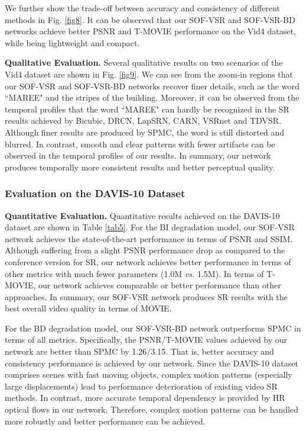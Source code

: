 \documentclass[journal]{IEEEtran}
\begin{document}
\begin{table*}[htp]
	We further show the trade-off between accuracy and consistency of different methods in Fig. \ref{fig8}. It can be observed that our SOF-VSR and SOF-VSR-BD networks achieve better PSNR and T-MOVIE performance on the Vid4 dataset, while being lightweight and compact.
	
	\textbf{Qualitative Evaluation.}
	Several qualitative results on two scenarios of the Vid4 dataset are shown in Fig. \ref{fig9}. We can see from the zoom-in regions that our SOF-VSR and SOF-VSR-BD networks recover finer details, such as the word ``MAREE" and the stripes of the building. Moreover, it can be observed from the temporal profiles that the word ``MAREE" can hardly be recognized in the SR results achieved by Bicubic, DRCN, LapSRN, CARN, VSRnet and TDVSR. Although finer results are produced by SPMC, the word is still distorted and blurred. In contrast, smooth and clear patterns with fewer artifacts can be observed in the temporal profiles of our results. In summary, our network produces temporally more consistent results and better perceptual quality.
	
	
	\subsubsection{Evaluation on the DAVIS-10 Dataset} \indent
	
	\textbf{Quantitative Evaluation.} 
	Quantitative results achieved on the DAVIS-10 dataset are shown in Table \ref{tab5}. For the BI degradation model, our SOF-VSR network achieves the state-of-the-art performance in terms of PSNR and SSIM. Although suffering from a slight PSNR performance drop as compared to the conference version for  SR, our network  achieves better performance in terms of other metrics with much fewer parameters (1.0M \emph{vs.} 1.5M). In terms of T-MOVIE, our network achieves comparable or better performance than other approaches. In summary, our SOF-VSR network produces SR results with the best overall video quality in terms of MOVIE. 
	
	For the BD degradation model, our SOF-VSR-BD network outperforms SPMC in terms of all metrics. Specifically, the PSNR/T-MOVIE values achieved by our network are better than SPMC by \textcolor{black}{1.26}/3.15. That is, better accuracy and consistency performance is achieved by our network. Since the DAVIS-10 dataset comprises scenes with fast moving objects, complex motion patterns (especially large displacements) lead to performance deterioration of existing video SR methods. In contrast, more accurate temporal dependency is provided by HR optical flows in our network. Therefore, complex motion patterns can be handled more robustly and better performance can be achieved.
	

\end{table*}
\end{document}
